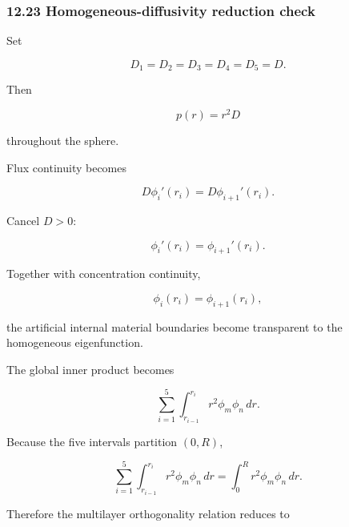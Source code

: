 \documentclass[11pt,a4paper]{article}
\begin{document}
\subsubsection*{12.23 Homogeneous-diffusivity reduction check}

Set

\begin{equation}
D_1=D_2=D_3=D_4=D_5=D.
\tag{TRISO-ML-564}
\label{eq:triso-ml-564}
\end{equation}

Then

\begin{equation}
p(r)=r^2D
\tag{TRISO-ML-565}
\label{eq:triso-ml-565}
\end{equation}

throughout the sphere.

Flux continuity becomes

\begin{equation}
D\phi_i'(r_i)=D\phi_{i+1}'(r_i).
\tag{TRISO-ML-566}
\label{eq:triso-ml-566}
\end{equation}

Cancel $D>0$:

\begin{equation}
\phi_i'(r_i)=\phi_{i+1}'(r_i).
\tag{TRISO-ML-567}
\label{eq:triso-ml-567}
\end{equation}

Together with concentration continuity,

\begin{equation}
\phi_i(r_i)=\phi_{i+1}(r_i),
\tag{TRISO-ML-568}
\label{eq:triso-ml-568}
\end{equation}

the artificial internal material boundaries become transparent to the homogeneous eigenfunction.

The global inner product becomes

\begin{equation}
\sum_{i=1}^{5}
\int_{r_{i-1}}^{r_i}
r^2\phi_m\phi_n\,dr.
\tag{TRISO-ML-569}
\label{eq:triso-ml-569}
\end{equation}

Because the five intervals partition $(0,R)$,

\begin{equation}
\sum_{i=1}^{5}
\int_{r_{i-1}}^{r_i}
r^2\phi_m\phi_n\,dr
=
\int_0^R
r^2\phi_m\phi_n\,dr.
\tag{TRISO-ML-570}
\label{eq:triso-ml-570}
\end{equation}

Therefore the multilayer orthogonality relation reduces to
\end{document}
